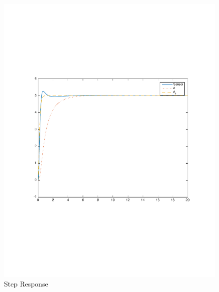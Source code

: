 \documentclass[12pt]{article}
\begin{document}
\begin{figure}[h]
\begin{center}
\includegraphics[width=1\textwidth]{figures/sensor}
\caption{Step Response}
\end{center}
\end{figure}


\end{document}
